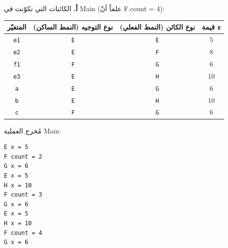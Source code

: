 \def\bagrutTocEntry{\phantomsection\addcontentsline{toc}{subsection}{\texorpdfstring{سؤال $12$ امتحان $\mathrm{899271B}$ سنة $2026$}{سؤال 12 امتحان 899271B سنة 2026}}\global\let\bagrutTocEntry\relax}%



\ifwithsols
\begin{boxSolution}
\textbf{أ.} الكائنات التي تكوّنت في \textenglish{Main} (علماً أنّ \textenglish{F.count = 4}):
\begin{center}
\begin{english}
\begin{tabular}{|c|c|c|c|}
\hline
\textbf{\textarabic{المتغيّر}} & \textbf{\textarabic{نوع التوجيه (النمط الساكن)}} & \textbf{\textarabic{نوع الكائن (النمط الفعلي)}} & \textbf{\textarabic{قيمة} \texttt{x}} \\
\hline
\texttt{e1} & \texttt{E} & \texttt{E} & $5$ \\ \hline
\texttt{e2} & \texttt{E} & \texttt{F} & $8$ \\ \hline
\texttt{f1} & \texttt{F} & \texttt{G} & $6$ \\ \hline
\texttt{e3} & \texttt{E} & \texttt{H} & $10$ \\ \hline
\texttt{a} & \texttt{E} & \texttt{G} & $6$ \\ \hline
\texttt{b} & \texttt{E} & \texttt{H} & $10$ \\ \hline
\texttt{c} & \texttt{F} & \texttt{G} & $6$ \\ \hline
\end{tabular}
\end{english}
\end{center}

مُخرج العملية \textenglish{Main}:
\begin{boxCode}
\begin{english}
\begin{verbatim}
E x = 5
F count = 2
G x = 6
E x = 5
H x = 10
F count = 3
G x = 6
E x = 5
H x = 10
F count = 4
G x = 6
\end{verbatim}
\end{english}
\end{boxCode}
\end{boxSolution}

\filbreak


